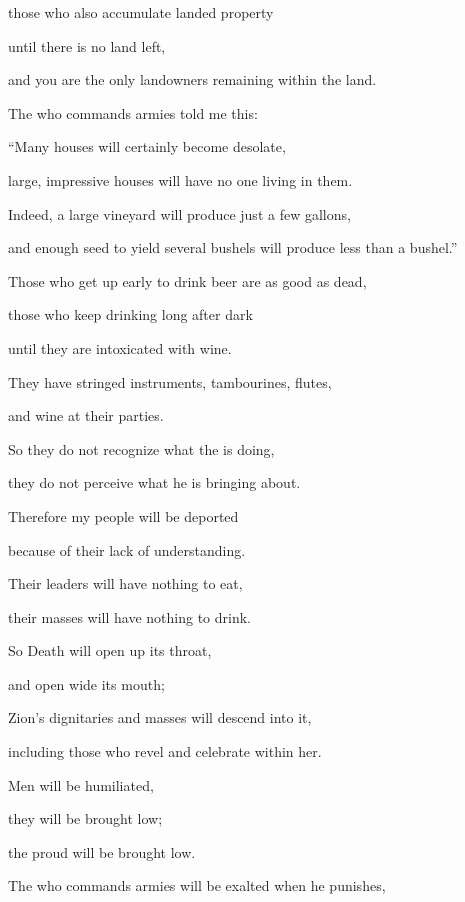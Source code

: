 {\par }{\Q those who also accumulate
landed
property

\par }{\Q until
there is no land left,

\par }{\Q and you are the only
landowners
remaining within
the land.
\par }{\Q {}The
{}
who commands armies
told
me this:

\par }{\Q “Many
houses
will certainly become desolate,
\par }{\Q large,
impressive
houses will have no
one living in them.
\par }{\Q {}Indeed,
a large
vineyard
will produce
just a few
gallons,
\par }{\Q and enough seed
to yield several bushels
will produce
less than a bushel.”
\par }{\Q {}Those who get up
early
to drink beer
are as good as dead,
\par }{\Q those who keep
drinking long after
dark
\par }{\Q until they are intoxicated
with wine.
\par }{\Q {}They have stringed instruments,
tambourines,
flutes,
\par }{\Q and wine
at their parties.
\par }{\Q So they do not
recognize
what the
{}
is doing,
\par }{\Q they do not
perceive what he is bringing about.
\par }{\Q {}Therefore
my people
will be deported
\par }{\Q because of their lack
of understanding.
\par }{\Q Their leaders
will have nothing to eat,
\par }{\Q their masses
will have nothing to drink.
\par }{\Q {}So
Death
will open
up
its throat,
\par }{\Q and open wide
its mouth;
\par }{\Q Zion’s dignitaries
and masses will descend
into it,
\par }{\Q including those who revel and celebrate within her.
\par }{\Q {}Men
will be humiliated,
\par }{\Q they
will be brought low;
\par }{\Q the proud
will be brought low.
\par }{\Q {}The
{}
who commands armies
will be exalted
when he punishes,

}
